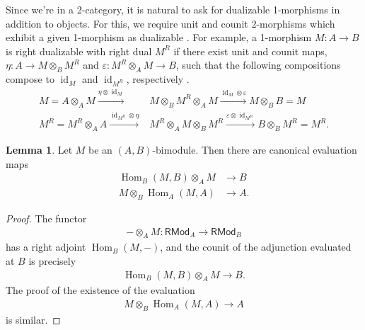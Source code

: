 \documentclass{article}
\numberwithin{equation}{section}
\theoremstyle{quest}
\theoremstyle{definition}
\newtheorem{lem}[thm]{Lemma}
\theoremstyle{remark}
\DeclareMathOperator{\Hom}{Hom}
\DeclareMathOperator{\id}{id}
\begin{document}
Since we're in a 2-category, it is natural to ask for dualizable 1-morphisms in addition to objects. For this, we require unit and counit 2-morphisms which exhibit a given 1-morphism as dualizable \cite{TFT}. For example, a 1-morphism $M:A\to B$ is right dualizable with right dual $M^R$ if there exist unit and counit maps, $\eta:A\to M\otimes _BM^R$ and $\varepsilon :M^R\otimes _AM\to B$, such that the following compositions compose to $\id_M$ and $\id_{M^R}$, respectively \cite[Definition 4.6.1.1]{HA}.
\begin{align*}
	M=A\otimes _AM\xrightarrow{\eta\otimes \id_M}&M\otimes _BM^R\otimes _AM\xrightarrow{\id_M\otimes \varepsilon }M\otimes _BB=M\\
	M^R=M^R\otimes _AA\xrightarrow{\id_{M^R}\otimes \eta}&M^R\otimes _AM\otimes _BM^R\xrightarrow{\varepsilon \otimes \id_{M^R}}B\otimes _BM^R=M^R.
\end{align*}
\begin{lem}\label{lem:eval-exists}
	Let $M$ be an $(A,B)$-bimodule. Then there are canonical evaluation maps
	\begin{align*}
		\Hom_B(M,B)\otimes _A M &\to B\\
		M\otimes _B\Hom_A(M,A)&\to A.
	\end{align*} 
\end{lem} 
\begin{proof}
	The functor
	\begin{align*}
		-\otimes _A M: \mathsf{RMod}_A\to \mathsf{RMod}_B
	\end{align*} 
	has a right adjoint $\Hom_B(M,-)$, and the counit of the adjunction evaluated at $B$ is precisely
	\begin{align*}
		\Hom_B(M,B)\otimes _AM\to B.
	\end{align*} 
	The proof of the existence of the evaluation
	\begin{align*}
		M\otimes _B\Hom_A(M,A)\to A
	\end{align*} 
	is similar.
\end{proof} 

 
\end{document}
